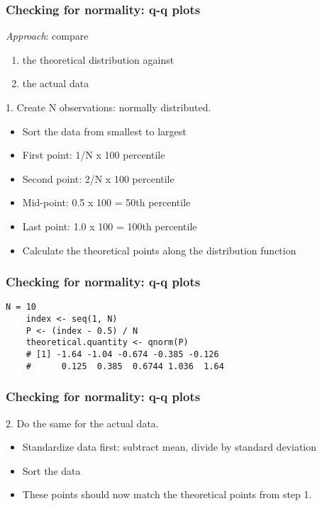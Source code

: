 \begin{frame}\frametitle{Checking for normality: q-q plots}

	\emph{Approach}: compare
	\begin{enumerate}
		\item	the theoretical distribution against
		\item	the actual data
	\end{enumerate}

	1. Create N observations: normally distributed.
	\begin{itemize}
		\item	Sort the data from smallest to largest
		\item	First point: 1/N x 100 percentile
		\item	Second point: 2/N x 100 percentile
		\item	Mid-point: 0.5 x 100 = 50th percentile
		\item	Last point: 1.0 x 100 = 100th percentile
		\item	Calculate the theoretical points along the distribution function
	\end{itemize}
\end{frame}

\begin{frame}[fragile]\frametitle{Checking for normality: q-q plots}
	
	\begin{lstlisting}[R]
	N = 10
	index <- seq(1, N)
	P <- (index - 0.5) / N
	theoretical.quantity <- qnorm(P)
	# [1] -1.64 -1.04 -0.674 -0.385 -0.126
	#      0.125  0.385  0.6744 1.036  1.64
	\end{lstlisting}
\end{frame}

\begin{frame}[fragile]\frametitle{Checking for normality: q-q plots}
	2. Do the same for the actual data.
	\begin{itemize}
		\item	Standardize data first: subtract mean, divide by standard deviation
		\item	Sort the data
		\item	These points should now match the theoretical points from step 1.
	\end{itemize}
	\vfill
\end{frame}

